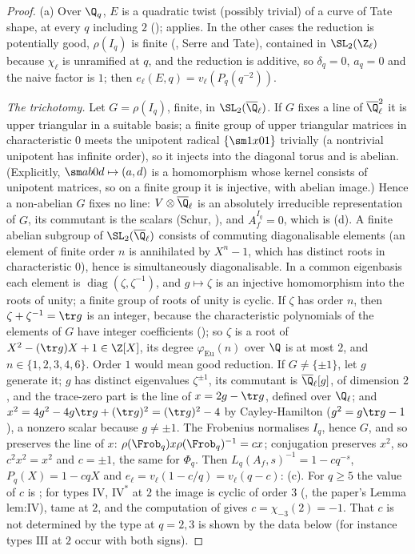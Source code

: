 \begin{proof}
(a) Over $\Q_q$, $E$ is a quadratic twist (possibly trivial) of a curve of Tate shape, at every $q$ including $2$ (); 
applies. In the other cases the reduction is potentially good, $\rho(I_q)$ is finite (, Serre and Tate), contained in $\SL_2(\Z_\ell)$ because $\chi_\ell$ is
unramified at $q$, and the reduction is additive, so $\delta_q=0$, $a_q=0$ and the naive factor is $1$; then $e_\ell(E,q)=v_\ell(P_q(q^{-2}))$.

\emph{The trichotomy.} Let $G=\rho(I_q)$, finite, in $\SL_2(\overline\Q_\ell)$. If $G$ fixes a line of $\overline\Q_\ell^2$ it is upper triangular in a suitable basis; a finite group of
upper triangular matrices in characteristic $0$ meets the unipotent radical $\{\sm1x01\}$ trivially (a nontrivial unipotent has infinite order), so it injects into the
diagonal torus and is abelian. (Explicitly, $\sm ab0d\mapsto(a,d)$ is a homomorphism whose kernel consists of unipotent matrices, so on a finite group it is injective, with
abelian image.) Hence a non-abelian $G$ fixes no line: $V\otimes\overline\Q_\ell$ is an absolutely irreducible representation of $G$, its commutant is the scalars
(Schur, ), and $A_f^{I_q}=0$, which is (d). A finite abelian subgroup of $\SL_2(\overline\Q_\ell)$ consists of commuting diagonalisable elements (an element of finite
order $n$ is annihilated by $X^n-1$, which has distinct roots in characteristic $0$), hence is simultaneously diagonalisable. In a common eigenbasis each element is
$\operatorname{diag}(\zeta,\zeta^{-1})$, and $g\mapsto\zeta$ is an injective homomorphism into the roots of unity; a finite group of roots of unity is cyclic. If $\zeta$ has
order $n$, then $\zeta+\zeta^{-1}=\tr g$ is an integer, because the characteristic polynomials of the elements of $G$ have integer coefficients \cite[Section 2]{SerreTate68}
(); so $\zeta$ is a root of $X^2-(\tr g)X+1\in\Z[X]$, its degree $\varphi_{\mathrm{Eu}}(n)$ over $\Q$ is at most $2$, and $n\in\{1,2,3,4,6\}$. Order $1$ would mean good reduction. If $G\ne\{\pm1\}$, let $g$ generate it; $g$ has distinct eigenvalues
$\zeta^{\pm1}$, its commutant is $\overline\Q_\ell[g]$, of dimension $2$, and the trace-zero part is the line of $x=2g-\tr g$, defined over $\Q_\ell$; and
$x^2=4g^2-4g\tr g+(\tr g)^2=(\tr g)^2-4$ by Cayley-Hamilton ($g^2=g\tr g-1$), a nonzero scalar because $g\ne\pm1$. The Frobenius normalises $I_q$, hence $G$, and so preserves the
line of $x$: $\rho(\Frob_q)x\rho(\Frob_q)^{-1}=cx$; conjugation preserves $x^2$, so $c^2x^2=x^2$ and $c=\pm1$, the same for $\Phi_q$. Then $L_q(A_f,s)^{-1}=1-cq^{-s}$,
$P_q(X)=1-cqX$ and $e_\ell=v_\ell(1-c/q)=v_\ell(q-c)$: (c). For $q\ge5$ the value of $c$ is ; for types $\mathrm{IV}$, $\mathrm{IV}^*$ at $2$ the image is cyclic of
order $3$ (, the paper's Lemma lem:IV), tame at $2$, and the computation of  gives $c=\chi_{-3}(2)=-1$. That $c$ is not determined by the
type at $q=2,3$ is shown by the data below (for instance types $\mathrm{III}$ at $2$ occur with both signs).


\end{proof}
